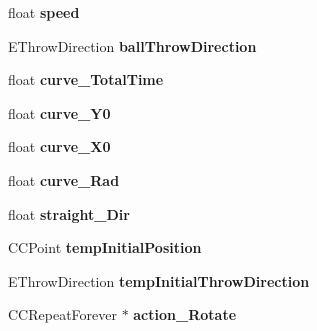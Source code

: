 \begin{DoxyCompactItemize}
\item 
\hypertarget{class_j_g___ball_ad4aa2855022e5315addf40ef73ee6972}{float {\bfseries speed}}\label{class_j_g___ball_ad4aa2855022e5315addf40ef73ee6972}

\item 
\hypertarget{class_j_g___ball_a743ed73473f38e9466f305c3f8efe995}{E\-Throw\-Direction {\bfseries ball\-Throw\-Direction}}\label{class_j_g___ball_a743ed73473f38e9466f305c3f8efe995}

\item 
\hypertarget{class_j_g___ball_af0bd7eeacc5d8f094d921663843b5179}{float {\bfseries curve\-\_\-\-Total\-Time}}\label{class_j_g___ball_af0bd7eeacc5d8f094d921663843b5179}

\item 
\hypertarget{class_j_g___ball_a681ecc9587d2d8d857f656d19d297ef8}{float {\bfseries curve\-\_\-\-Y0}}\label{class_j_g___ball_a681ecc9587d2d8d857f656d19d297ef8}

\item 
\hypertarget{class_j_g___ball_a8dcbff9b6d7f9f8737b3421f26c699e7}{float {\bfseries curve\-\_\-\-X0}}\label{class_j_g___ball_a8dcbff9b6d7f9f8737b3421f26c699e7}

\item 
\hypertarget{class_j_g___ball_a32222cd24992fff289361884db472b23}{float {\bfseries curve\-\_\-\-Rad}}\label{class_j_g___ball_a32222cd24992fff289361884db472b23}

\item 
\hypertarget{class_j_g___ball_a399ae1fb026df3759d3616c7b74eecaa}{float {\bfseries straight\-\_\-\-Dir}}\label{class_j_g___ball_a399ae1fb026df3759d3616c7b74eecaa}

\item 
\hypertarget{class_j_g___ball_a2cab0645b2eb4374fbfde0b0399c0e72}{C\-C\-Point {\bfseries temp\-Initial\-Position}}\label{class_j_g___ball_a2cab0645b2eb4374fbfde0b0399c0e72}

\item 
\hypertarget{class_j_g___ball_a358259dea815fa262327e0af48a6af3c}{E\-Throw\-Direction {\bfseries temp\-Initial\-Throw\-Direction}}\label{class_j_g___ball_a358259dea815fa262327e0af48a6af3c}

\item 
\hypertarget{class_j_g___ball_a602558390080ce6d8cdfcfdbc09f7b12}{C\-C\-Repeat\-Forever $\ast$ {\bfseries action\-\_\-\-Rotate}}\label{class_j_g___ball_a602558390080ce6d8cdfcfdbc09f7b12}


\end{DoxyCompactItemize}
